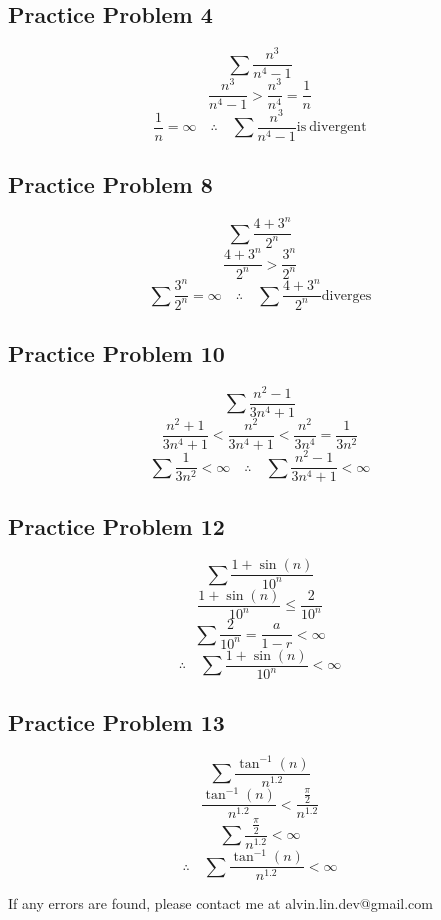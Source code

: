 \documentclass[letterpaper, 12pt]{article}
\renewcommand*{\arctan}{\tan^{-1}}
\begin{document}
\subsection*{Practice Problem 4}
\[ \sum\frac{n^{3}}{n^{4}-1} \]
\[ \frac{n^{3}}{n^{4}-1} > \frac{n^{3}}{n^{4}} = \frac{1}{n} \]
\[ \frac{1}{n} = \infty \quad \therefore \quad \sum\frac{n^{3}}{n^{4}-1}
   \mathrm{is\ divergent} \]

\subsection*{Practice Problem 8}
\[ \sum\frac{4+3^{n}}{2^{n}} \]
\[ \frac{4+3^{n}}{2^{n}} > \frac{3^{n}}{2^{n}} \]
\[ \sum\frac{3^{n}}{2^{n}} = \infty \quad \therefore \quad
   \sum\frac{4+3^{n}}{2^{n}} \mathrm{diverges} \]

\subsection*{Practice Problem 10}
\[ \sum\frac{n^{2}-1}{3n^{4}+1} \]
\[ \frac{n^{2}+1}{3n^{4}+1} < \frac{n^{2}}{3n^{4}+1} < \frac{n^{2}}{3n^{4}} =
   \frac{1}{3n^{2}} \]
\[ \sum\frac{1}{3n^{2}} < \infty \quad \therefore \quad
   \sum\frac{n^{2}-1}{3n^{4}+1} < \infty \]

\subsection*{Practice Problem 12}
\[ \sum\frac{1+\sin(n)}{10^{n}} \]
\[ \frac{1+\sin(n)}{10^{n}} \leq \frac{2}{10^{n}} \]
\[ \sum\frac{2}{10^{n}} = \frac{a}{1-r} < \infty \]
\[ \therefore \quad \sum\frac{1+\sin(n)}{10^{n}} < \infty \]

\subsection*{Practice Problem 13}
\[ \sum\frac{\arctan(n)}{n^{1.2}} \]
\[ \frac{\arctan(n)}{n^{1.2}} < \frac{\frac{\pi}{2}}{n^{1.2}} \]
\[ \sum\frac{\frac{\pi}{2}}{n^{1.2}} < \infty \]
\[ \therefore \quad \sum\frac{\arctan(n)}{n^{1.2}} < \infty \]

\begin{center}
  If any errors are found, please contact me at alvin.lin.dev@gmail.com
\end{center}
\end{document}
